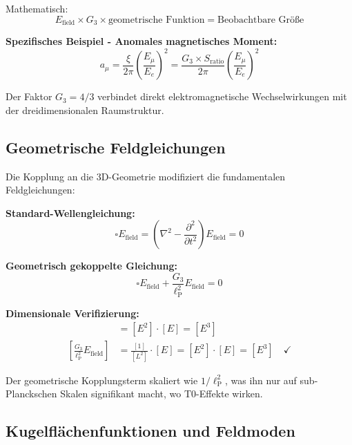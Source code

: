 \documentclass[12pt,a4paper]{report}
\newcommand{\lP}{\ell_{\text{P}}}         %
\begin{document}
	Mathematisch:
	\begin{equation}
		E_{\text{field}} \times G_3 \times \text{geometrische Funktion} = \text{Beobachtbare Größe}
	\end{equation}
	
	\textbf{Spezifisches Beispiel - Anomales magnetisches Moment:}
	\begin{equation}
		a_\mu = \frac{\xi}{2\pi} \left(\frac{E_\mu}{E_e}\right)^2 = \frac{G_3 \times S_{\text{ratio}}}{2\pi} \left(\frac{E_\mu}{E_e}\right)^2
	\end{equation}
	
	Der Faktor $G_3 = 4/3$ verbindet direkt elektromagnetische Wechselwirkungen mit der dreidimensionalen Raumstruktur.
	
	\subsection{Geometrische Feldgleichungen}
	\label{subsec:geometric_field_equations}
	
	Die Kopplung an die 3D-Geometrie modifiziert die fundamentalen Feldgleichungen:
	
	\textbf{Standard-Wellengleichung:}
	\begin{equation}
		\square E_{\text{field}} = \left(\nabla^2 - \frac{\partial^2}{\partial t^2}\right) E_{\text{field}} = 0
	\end{equation}
	
	\textbf{Geometrisch gekoppelte Gleichung:}
	\begin{equation}
		\square E_{\text{field}} + \frac{G_3}{\lP^2} E_{\text{field}} = 0
	\end{equation}
	
	\textbf{Dimensionale Verifizierung:}
	\begin{align}
		[\square E_{\text{field}}] &= [E^2] \cdot [E] = [E^3] \\
		\left[\frac{G_3}{\lP^2} E_{\text{field}}\right] &= \frac{[1]}{[L^2]} \cdot [E] = [E^2] \cdot [E] = [E^3] \quad \checkmark
	\end{align}
	
	Der geometrische Kopplungsterm skaliert wie $1/\lP^2$, was ihn nur auf sub-Planckschen Skalen signifikant macht, wo T0-Effekte wirken.
	
	\subsection{Kugelflächenfunktionen und Feldmoden}
	\label{subsec:spherical_harmonics}
	
\end{document}

